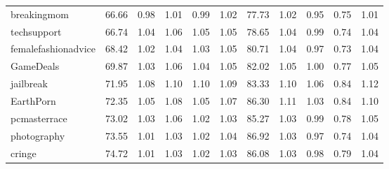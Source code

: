 \begin{tabular}{lrrrrrrrrrr}
breakingmom         &          66.66 &                0.98 &                1.01 &                0.99 &                1.02 &                 77.73 &                       1.02 &                       0.95 &                       0.75 &                       1.01 \\
techsupport         &          66.74 &                1.04 &                1.06 &                1.05 &                1.05 &                 78.65 &                       1.04 &                       0.99 &                       0.74 &                       1.04 \\
femalefashionadvice &          68.42 &                1.02 &                1.04 &                1.03 &                1.05 &                 80.71 &                       1.04 &                       0.97 &                       0.73 &                       1.04 \\
GameDeals           &          69.87 &                1.03 &                1.06 &                1.04 &                1.05 &                 82.02 &                       1.05 &                       1.00 &                       0.77 &                       1.05 \\
jailbreak           &          71.95 &                1.08 &                1.10 &                1.10 &                1.09 &                 83.33 &                       1.10 &                       1.06 &                       0.84 &                       1.12 \\
EarthPorn           &          72.35 &                1.05 &                1.08 &                1.05 &                1.07 &                 86.30 &                       1.11 &                       1.03 &                       0.84 &                       1.10 \\
pcmasterrace        &          73.02 &                1.03 &                1.06 &                1.02 &                1.03 &                 85.27 &                       1.03 &                       0.99 &                       0.78 &                       1.05 \\
photography         &          73.55 &                1.01 &                1.03 &                1.02 &                1.04 &                 86.92 &                       1.03 &                       0.97 &                       0.74 &                       1.04 \\
cringe              &          74.72 &                1.01 &                1.03 &                1.02 &                1.03 &                 86.08 &                       1.03 &                       0.98 &                       0.79 &                       1.04 \\

\end{tabular}
